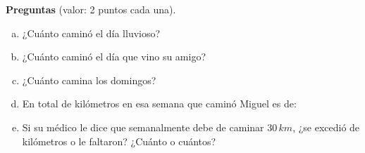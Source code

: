 \documentclass[letterpaper,11pt]{article}
\begin{document}
    \textbf{Preguntas} (valor: 2 puntos cada una).\\

\begin{enumerate}[(a)]
\item ¿Cuánto caminó el día lluvioso?
\item ¿Cuánto caminó el día que vino su amigo?
\item ¿Cuánto camina los domingos?
\item En total de kilómetros en esa semana que caminó Miguel es de:
\item Si su médico le dice que semanalmente debe de caminar $30 \, km$, ¿se excedió de kilómetros o le faltaron? ¿Cuánto o cuántos?
\end{enumerate}
\end{document}
